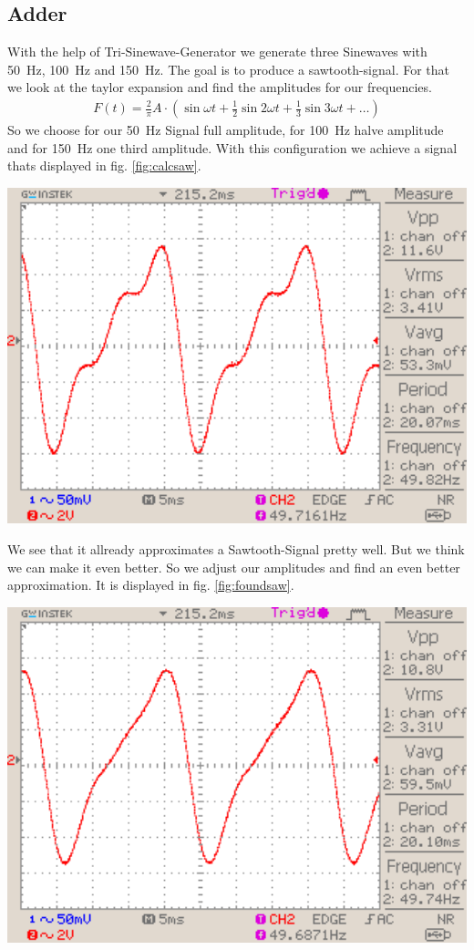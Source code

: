\documentclass[a4paper,10pt]{article}
\newenvironment{Figure}
        {\par\medskip\noindent\minipage{\linewidth}}
        {\endminipage\par\medskip}
\numberwithin{equation}{section}
\begin{document}
\begin{multicols}{2}
	\subsection{Adder}
	With the help of Tri-Sinewave-Generator we generate three Sinewaves with \SI{50}{Hz}, \SI{100}{Hz} and \SI{150}{Hz}. The goal is to produce a sawtooth-signal. For that we look at the taylor expansion and find the amplitudes for our frequencies.
	\begin{align}
		F(t)=\frac{2}{\pi}A\cdot\left(\sin{\omega t}+\frac{1}{2}\sin{2\omega t}+\frac{1}{3}\sin{3\omega t}+\dots\right)
	\end{align}
	So we choose for our \SI{50}{Hz} Signal full amplitude, for \SI{100}{Hz} halve amplitude and for \SI{150}{Hz} one third amplitude. With this configuration we achieve a signal thats displayed in fig. \ref{fig:calcsaw}.
	\begin{Figure}
		\centering
		\includegraphics[width=1\textwidth]{../data/DS0031_n.png}
		\label{fig:calcsaw}
	\end{Figure}
	We see that it allready approximates a Sawtooth-Signal pretty well. But we think we can make it even better. So we adjust our amplitudes and find an even better approximation. It is displayed in fig. \ref{fig:foundsaw}.
	\begin{Figure}
		\centering
		\includegraphics[width=1\textwidth]{../data/DS0030_n.png}

\end{Figure}
\end{multicols}
\end{document}
